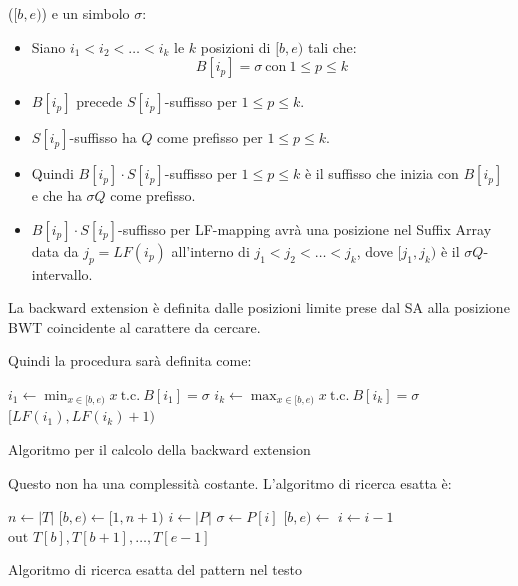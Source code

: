 ($[b, e)$) e un simbolo $\sigma$:
\begin{itemize}
    \item Siano $i_1 < i_2 < \dots < i_k$ le $k$ posizioni di $[b,e)$ tali che:
          \begin{equation}
              B[i_p] = \sigma \ \text{con} \ 1 \leq p \leq k
          \end{equation}
    \item $B[i_p]$ precede $S[i_p]$-suffisso per $1 \leq p \leq k$.
    \item $S[i_p]$-suffisso ha $Q$ come prefisso per $1 \leq p \leq k$.
    \item Quindi $B[i_p] \cdot S[i_p]$-suffisso per $1\le p \le k$ è il suffisso
          che inizia con $B[i_p]$ e che ha $\sigma Q$ come prefisso.
    \item $B[i_p] \cdot S[i_p]$-suffisso per LF-mapping avrà una posizione
          nel Suffix Array data da $j_p = LF(i_p)$ all'interno di $j_1 < j_2 <
              \dots < j_k$, dove $[j_1,j_k)$ è il $\sigma Q$-intervallo.
\end{itemize}
\begin{nota}
    La backward extension è definita dalle posizioni limite prese dal SA alla
    posizione BWT coincidente al carattere da cercare.
\end{nota}
Quindi la procedura sarà definita come:

\begin{algorithm}
    \begin{algorithmic}
        \State $i_1 \gets \min_{x\in [b,e)} x \ \text{t.c.} \ B[i_1] = \sigma$
        \State $i_k \gets \max_{x\in [b,e)} x \ \text{t.c.} \ B[i_k] = \sigma$
        \State \Return $[LF(i_1), LF(i_k)+1)$
        \EndFunction
    \end{algorithmic}
    \caption{Algoritmo per il calcolo della backward extension}
\end{algorithm}

Questo non ha una complessità costante. L'algoritmo di ricerca esatta è:

\begin{algorithm}
    \begin{algorithmic}
        \State $n \gets |T|$
        \State $[b,e) \gets [1, n+1)$
        \State $i \gets |P|$
        \While{$[b,e) \ \neq \ \text{null}\land i\ge 1$}
        \State $\sigma \gets P[i]$
        \State $[b,e) \gets$
        \State $i\gets i-1$
        \EndWhile
        \If{$[b,e)\ \neq \ \text{null}$}
        \State $\text{out } T[b], T[b+1], \dots, T[e-1]$
        \EndIf
        \EndFunction
    \end{algorithmic}
    \caption{Algoritmo di ricerca esatta del pattern nel testo}
\end{algorithm}

